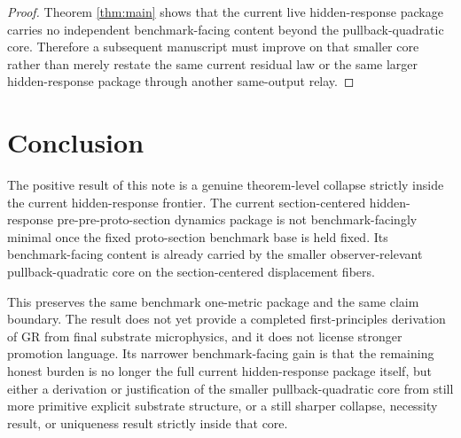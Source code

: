 \documentclass[11pt]{article}
\begin{document}
\begin{proof}
Theorem \ref{thm:main} shows that the current live hidden-response package carries no independent benchmark-facing content beyond the pullback-quadratic core. Therefore a subsequent manuscript must improve on that smaller core rather than merely restate the same current residual law or the same larger hidden-response package through another same-output relay.
\end{proof}

\section{Conclusion}

The positive result of this note is a genuine theorem-level collapse strictly inside the current hidden-response frontier. The current section-centered hidden-response pre-pre-proto-section dynamics package is not benchmark-facingly minimal once the fixed proto-section benchmark base is held fixed. Its benchmark-facing content is already carried by the smaller observer-relevant pullback-quadratic core on the section-centered displacement fibers.

This preserves the same benchmark one-metric package and the same claim boundary. The result does not yet provide a completed first-principles derivation of GR from final substrate microphysics, and it does not license stronger promotion language. Its narrower benchmark-facing gain is that the remaining honest burden is no longer the full current hidden-response package itself, but either a derivation or justification of the smaller pullback-quadratic core from still more primitive explicit substrate structure, or a still sharper collapse, necessity result, or uniqueness result strictly inside that core.
\end{document}
